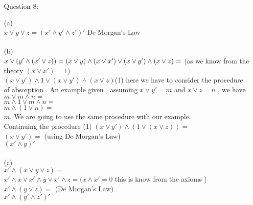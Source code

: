 \documentclass[addpoints,10pt,answers]{exam}
\begin{document}
\begin{questions}
\question Question 8:
\begin{solution}
(a)\\$x \lor y \lor z = (x' \land y' \land z' )'$ De Morgan's Law\\\\

(b)\\$ x \lor ( y' \land ( x' \lor z )) = \\
(x \lor y)\land(x \lor x') \lor (x \lor y')\land(x \lor z) = $
(as we know from the theory $(x \lor x') = 1$)\\
$(x \lor y') \land 1 \lor (x \lor y')\land(x \lor z)$(1)
here we have to consider the procedure of absorption . An example given , assuming $x \lor y' = m$ and $x \lor z = n$ , we have $m \lor m \land n = $\\
$m \land 1 \lor m \land n=$\\
$m \land (1 \lor n)=$\\
$m$. We are going to use the same procedure with our example.\\

Continuing the procedure (1)
$(x \lor y')\land(1 \lor (x \lor z))=$\\
$(x \lor y')=$            (using De Morgan's Law)\\
$(x' \land y)'$\\\\

(c)\\
$x'\land(x \lor y \lor z)=$\\
$x'\land x \lor x' \land y \lor x' \land z=(x \land x' =0$              this is know from the axioms )\\
$x' \land (y \lor z)= $         (De Morgan's Law)\\
$x'\land(y'\land z')'$

\end{solution}


 


\end{questions}
\end{document}
